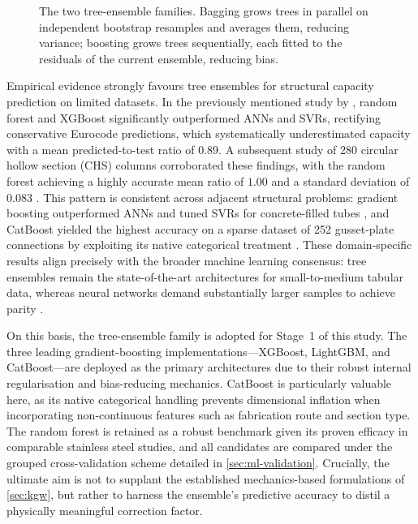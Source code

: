 \begin{figure}[tbp]
  \centering
  \resizebox{\textwidth}{!}{}
  \caption[Bagging versus boosting ensemble strategies]{The two tree-ensemble
    families. Bagging grows trees in parallel on independent bootstrap resamples
    and averages them, reducing variance; boosting grows trees sequentially,
    each fitted to the residuals of the current ensemble, reducing bias.}
  \label{fig:bagging-boosting}
\end{figure}

Empirical evidence strongly favours tree ensembles for structural capacity prediction on limited datasets. In the previously mentioned study by \textcite{xu2021a}, random forest and XGBoost significantly outperformed ANNs and SVRs, rectifying conservative Eurocode predictions, which systematically underestimated capacity with a mean predicted-to-test ratio of $0.89$. A subsequent study of 280 circular hollow section (CHS) columns corroborated these findings, with the random forest achieving a highly accurate mean ratio of $1.00$ and a standard deviation of $0.083$ \parencite{xu2021b}. This pattern is consistent across adjacent structural problems: gradient boosting outperformed ANNs and tuned SVRs for concrete-filled tubes \parencite{megahed2023}, and CatBoost yielded the highest accuracy on a sparse dataset of 252 gusset-plate connections by exploiting its native categorical treatment \parencite{rahman2024}. These domain-specific results align precisely with the broader machine learning consensus: tree ensembles remain the state-of-the-art architectures for small-to-medium tabular data, whereas neural networks demand substantially larger samples to achieve parity \parencite{grinsztajn2022,shwartzziv2021}.

On this basis, the tree-ensemble family is adopted for Stage~1 of this study. The three leading gradient-boosting implementations---XGBoost, LightGBM, and CatBoost---are deployed as the primary architectures due to their robust internal regularisation and bias-reducing mechanics. CatBoost is particularly valuable here, as its native categorical handling prevents dimensional inflation when incorporating non-continuous features such as fabrication route and section type. The random forest is retained as a robust benchmark given its proven efficacy in comparable stainless steel studies, and all candidates are compared under the grouped cross-validation scheme detailed in \cref{sec:ml-validation}. Crucially, the ultimate aim is not to supplant the established mechanics-based formulations of \cref{sec:kgw}, but rather to harness the ensemble's predictive accuracy to distil a physically meaningful correction factor.

